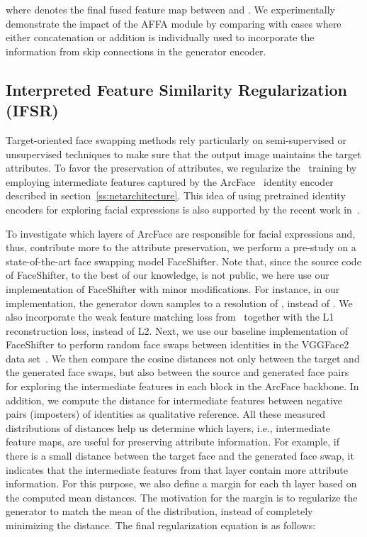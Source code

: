 \documentclass[10pt,twocolumn,letterpaper]{article}
\newcommand{\fti}[1]{\textit{FaceDancer}{#1}}
\begin{document}
where  denotes the final fused feature map between  and . 
We  experimentally demonstrate the impact of the AFFA module by comparing with cases where either concatenation or addition is individually used to incorporate the information from skip connections in the generator encoder.



\subsection{Interpreted Feature Similarity Regularization (IFSR)}
\label{ss:ifsr}
Target-oriented face swapping methods  rely particularly on semi-supervised or unsupervised techniques  to make sure that the output image maintains the target attributes.
To favor the preservation of attributes, we regularize the \fti~training by employing intermediate features captured by the ArcFace~\cite{arcface}  identity encoder described in section~\ref{ss:netarchitecture}. 
This idea of  using pretrained identity encoders for exploring facial expressions  is also supported by the recent work in~\cite{facenetexp}.

To investigate which layers of ArcFace are responsible for facial expressions and, thus, contribute more to the attribute preservation, we perform a pre-study on a state-of-the-art face swapping model  FaceShifter\cite{faceshifter}. Note that, since the source code of  FaceShifter\cite{faceshifter}, to the best of our knowledge, is not public, we here use our implementation of  FaceShifter with minor modifications. For instance, in our implementation, the generator  down samples  to a resolution of , instead of . We also incorporate the weak feature matching loss from~\cite{simswap} together with the L1 reconstruction loss, instead of L2. 
Next, we use our baseline implementation of FaceShifter to perform random face swaps between identities in the VGGFace2 data set~\cite{vggface2}.
We then compare the cosine distances not only between the target and the generated face swaps, but also between the source  and generated face   pairs for exploring the intermediate features in each block in the ArcFace backbone.
In addition, we compute the distance for intermediate features   between negative pairs (imposters) of identities as qualitative reference. 
All these measured distributions of distances help us determine which layers, i.e., intermediate feature maps, are useful for preserving attribute information. 
For example, if there is a small distance between the target face and the generated face swap, it indicates that the intermediate features from that layer contain  more attribute information.
For this purpose, we also define a margin  for each th layer based on the computed mean distances. The motivation for the margin is to regularize the generator to match the mean of the distribution, instead of completely minimizing the distance. The final regularization equation is as follows:
\end{document}
